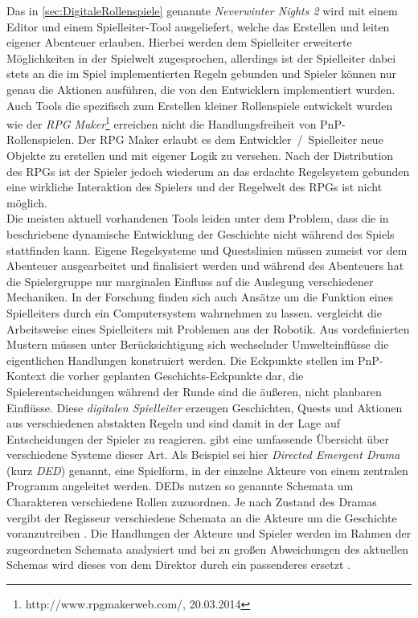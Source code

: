 Das in \ref{sec:DigitaleRollenspiele} genannte \emph{Neverwinter Nights 2} wird mit einem Editor und einem Spielleiter-Tool ausgeliefert, welche das Erstellen und leiten eigener Abenteuer erlauben. Hierbei werden dem Spielleiter erweiterte Möglichkeiten in der Spielwelt zugesprochen, allerdings ist der Spielleiter dabei stets an die im Spiel implementierten Regeln gebunden und Spieler können nur genau die Aktionen ausführen, die von den Entwicklern implementiert wurden.~\cite{Tychsen2006a}\newline
Auch Tools die spezifisch zum Erstellen kleiner Rollenspiele entwickelt wurden wie der \emph{RPG Maker}\footnote{http://www.rpgmakerweb.com/, 20.03.2014} erreichen nicht die Handlungsfreiheit von PnP-Rollenspielen. Der RPG Maker erlaubt es dem Entwickler~/~Spielleiter neue Objekte zu erstellen und mit eigener Logik zu versehen. Nach der Distribution des RPGs ist der Spieler jedoch wiederum an das erdachte Regelsystem gebunden eine wirkliche Interaktion des Spielers und der Regelwelt des RPGs ist nicht möglich.\\
Die meisten aktuell vorhandenen Tools leiden unter dem Problem, dass die in \cite{Arinbjarnar} beschriebene dynamische Entwicklung der Geschichte nicht während des Spiels stattfinden kann. Eigene Regelsysteme und Questslinien müssen zumeist vor dem Abenteuer ausgearbeitet und finalisiert werden und während des Abenteuers hat die Spielergruppe nur marginalen Einfluss auf die Auslegung verschiedener Mechaniken.\newline
In der Forschung finden sich auch Ansätze um die Funktion eines Spielleiters durch ein Computersystem wahrnehmen zu lassen. \cite{Aylett2007} vergleicht die Arbeitsweise eines Spielleiters mit Problemen aus der Robotik. Aus vordefinierten Mustern müssen unter Berücksichtigung sich wechselnder Umwelteinflüsse die eigentlichen Handlungen konstruiert werden. Die Eckpunkte stellen im PnP-Kontext die vorher geplanten Geschichts-Eckpunkte dar, die Spielerentscheidungen während der Runde sind die äußeren, nicht planbaren Einflüsse.\newline
Diese \emph{digitalen Spielleiter} erzeugen Geschichten, Quests und Aktionen aus verschiedenen abstakten Regeln und sind damit in der Lage auf Entscheidungen der Spieler zu reagieren. \cite{Arinbjarnarb} gibt eine umfassende Übersicht über verschiedene Systeme dieser Art. Als Beispiel sei hier \emph{Directed Emergent Drama} (kurz \emph{DED}) \cite{Arinbjarnara} genannt, eine Spielform, in der einzelne Akteure von einem zentralen Programm angeleitet werden. DEDs nutzen so genannte Schemata um Charakteren verschiedene Rollen zuzuordnen. Je nach Zustand des Dramas vergibt der Regisseur verschiedene Schemata an die Akteure um die Geschichte voranzutreiben \cite{Arinbjarnarb}. Die Handlungen der Akteure und Spieler werden im Rahmen der zugeordneten Schemata analysiert und bei zu großen Abweichungen des aktuellen Schemas wird dieses von dem Direktor durch ein passenderes ersetzt \cite{Arinbjarnar}.\newline
